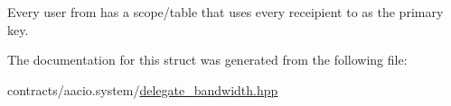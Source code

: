 Every user \textquotesingle{}from\textquotesingle{} has a scope/table that uses every receipient \textquotesingle{}to\textquotesingle{} as the primary key. 

The documentation for this struct was generated from the following file\+:\begin{DoxyCompactItemize}
\item 
contracts/aacio.\+system/\mbox{\hyperlink{delegate__bandwidth_8hpp}{delegate\+\_\+bandwidth.\+hpp}}\end{DoxyCompactItemize}
